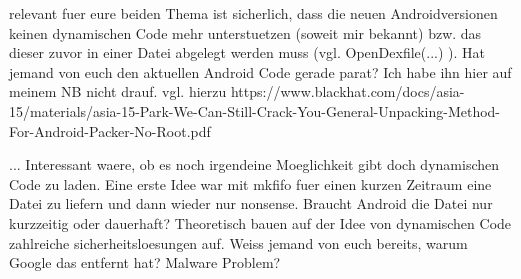 relevant fuer eure beiden Thema ist sicherlich, dass die neuen Androidversionen keinen dynamischen Code mehr unterstuetzen (soweit mir bekannt) bzw. das dieser zuvor in einer Datei abgelegt werden muss (vgl. OpenDexfile(...) ).  Hat jemand von euch den aktuellen Android Code gerade parat? Ich habe ihn hier auf meinem NB nicht drauf.
vgl. hierzu
https://www.blackhat.com/docs/asia-15/materials/asia-15-Park-We-Can-Still-Crack-You-General-Unpacking-Method-For-Android-Packer-No-Root.pdf​

... Interessant waere, ob es noch irgendeine Moeglichkeit gibt doch dynamischen Code zu laden. Eine erste Idee war mit mkfifo fuer einen kurzen Zeitraum eine Datei zu liefern und dann wieder nur nonsense. Braucht Android die Datei nur kurzzeitig oder dauerhaft? Theoretisch bauen auf der Idee von dynamischen Code zahlreiche sicherheitsloesungen auf. Weiss jemand von euch bereits, warum Google das entfernt hat? Malware Problem?
